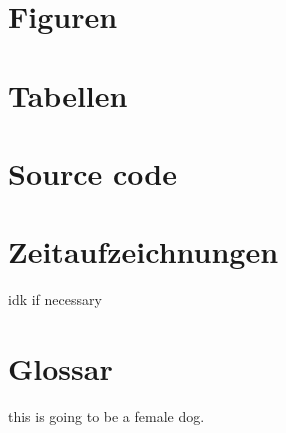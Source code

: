 \documentclass[letterpaper, 12pt]{article}
\begin{document}
\parindent 0pt
\parskip 6pt



\clearpage
\tableofcontents
\clearpage



 
\clearpage
{}
\pagestyle{fancy}






\lfoot{}

\clearpage
\begingroup


\endgroup

\clearpage
\begin{appendices}
	\section{Figuren}
		\makeatletter
		\makeatother
	\section{Tabellen}
		\makeatletter
		\makeatother
	\section{Source code}
		\makeatletter
		\makeatother
	\section{Zeitaufzeichnungen}
		\todo idk if necessary
	\section{Glossar}
		\todo this is going to be a female dog.
\end{appendices}
\end{document}
